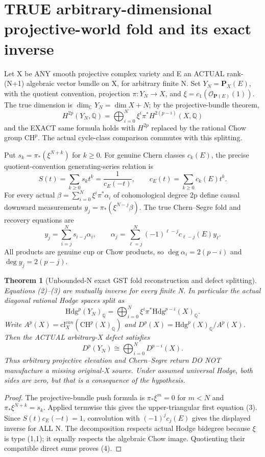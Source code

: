 \documentclass[11pt]{article}
\newcommand{\Q}{\mathbb Q}
\newcommand{\CH}{\mathrm{CH}}
\newcommand{\Hdg}{\mathrm{Hdg}}
\newcommand{\cl}{\mathrm{cl}}
\newtheorem{theorem}{Theorem}
\begin{document}
\section{TRUE arbitrary-dimensional projective-world fold and its exact inverse}
Let X be ANY smooth projective complex variety and
E an ACTUAL rank-(N+1) algebraic vector bundle on X,
for arbitrary finite N. Set
\(Y_N=\mathbf P_X(E)\), with the quotient convention,
projection \(\pi:Y_N\to X\), and
\(\xi=c_1(\mathcal O_{\mathbf P(E)}(1))\).
The true dimension is \(\dim_{\mathbb C}Y_N=\dim X+N\);
by the projective-bundle theorem,
\[
 \boxed{H^{2p}(Y_N,\Q)
 =\bigoplus_{i=0}^N\xi^i\pi^*H^{2(p-i)}(X,\Q)}
                                                               \tag{2}
\]
and the EXACT same formula holds with \(H^{2p}\)
replaced by the rational Chow group \(\CH^p\).
The actual cycle-class comparison commutes with this splitting.

Put \(s_k=\pi_*(\xi^{N+k})\) for \(k\ge0\).
For genuine Chern classes \(c_k(E)\), the precise
quotient-convention generating-series relation is
\[
 S(t)=\sum_{k\ge0}s_kt^k=\frac1{c_E(-t)},\qquad
 c_E(t)=\sum_{k\ge0}c_k(E)t^k.
\]
For every actual \(\beta=\sum_{i=0}^N\xi^i\pi^*\alpha_i\)
of cohomological degree 2p define causal
downward measurements \(y_j=\pi_*(\xi^{N-j}\beta)\).
The true Chern--Segre fold and recovery equations are
\[
 \boxed{y_j=\sum_{i=j}^Ns_{i-j}\alpha_i,\qquad
 \alpha_j=\sum_{\ell=j}^N(-1)^{\ell-j}c_{\ell-j}(E)y_\ell.}
                                                               \tag{3}
\]
All products are genuine cup or Chow products,
so \(\deg\alpha_i=2(p-i)\) and \(\deg y_j=2(p-j)\).

\begin{theorem}[Unbounded-N exact GST fold reconstruction and defect splitting]
Equations (2)--(3) are mutually inverse for every finite N.
In particular the actual diagonal rational Hodge spaces split as
\[
 \Hdg^p(Y_N)_\Q
     =\bigoplus_{i=0}^N\xi^i\pi^*\Hdg^{p-i}(X)_\Q.
\]
Write \(A^p(X)=\cl_X^{can}(\CH^p(X)_\Q)\) and
\(D^p(X)=\Hdg^p(X)_\Q/A^p(X)\).
Then the ACTUAL arbitrary-X defect satisfies
\[
 \boxed{D^p(Y_N)\cong\bigoplus_{i=0}^ND^{p-i}(X).} \tag{4}
\]
Thus arbitrary projective elevation and Chern--Segre
return DO NOT manufacture a missing original-X source.
Under assumed universal Hodge, both sides are zero,
but that is a consequence of the hypothesis.
\end{theorem}
\begin{proof}
The projective-bundle push formula is
\(\pi_*\xi^m=0\) for \(m<N\) and
\(\pi_*\xi^{N+k}=s_k\). Applied termwise this gives
the upper-triangular first equation (3).
Since \(S(t)c_E(-t)=1\), convolution with
\((-1)^jc_j(E)\) gives the displayed inverse for
ALL N. The decomposition respects actual Hodge
bidegree because \(\xi\) is type (1,1);
it equally respects the algebraic Chow image.
Quotienting their compatible direct sums proves (4).
\end{proof}
\end{document}
